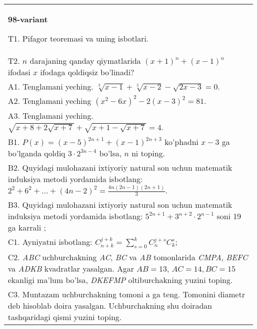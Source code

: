 \documentclass{article}
\begin{document}
\begin{tabular}{m{17cm}}
\textbf{98-variant}
\newline

T1. Pifagor teoremasi va uning isbotlari. \\
T2. \(n\) darajaning qanday qiymatlarida \((x + 1)^{n} + (x - 1)^{n}\) ifodasi \(x\) ifodaga qoldiqsiz bo'linadi? \\
A1. Tenglamani yeching. \(\sqrt[3]{x - 1} + \sqrt[3]{x - 2} - \sqrt{2x - 3} = 0\). \\
A2. Tenglamani yeching \(\left( x^{2} - 6x \right)^{2} - 2(x - 3)^{2} = 81\). \\
A3. Tenglamani yeching. \(\sqrt{x + 8 + 2\sqrt{x + 7}} + \sqrt{x + 1 - \sqrt{x + 7}} = 4\). \\
B1. \(P(x) = (x - 5)^{2n + 1} + (x - 1)^{2n + 3}\) ko'phadni \(x - 3\) ga bo'lganda qoldiq \(3 \cdot 2^{3n - 4}\) bo'lsa, \(n\) ni toping. \\
B2. Quyidagi mulohazani ixtiyoriy natural son uchun matematik induksiya metodi yordamida isbotlang: \(2^{2} + 6^{2} + \ldots + (4n - 2)^{2} = \frac{4n(2n - 1)(2n + 1)}{3}\). \\
B3. Quyidagi mulohazani ixtiyoriy natural son uchun matematik induksiya metodi yordamida isbotlang: \(5^{2n + 1} + 3^{n + 2} \cdot 2^{n - 1}\) soni 19 ga karrali ; \\
C1. Ayniyatni isbotlang: \(C_{n + k}^{j + k} = \sum_{s = 0}^{k}C_{n}^{j + s}C_{k}^{s}\); \\
C2. \emph{ABC} uchburchakning \emph{AC}, \emph{BC} va \emph{AB} tomonlarida \emph{CMPA}, \emph{BEFC} va \emph{ADKB} kvadratlar yasalgan. Agar \(AB = 13\), \(AC = 14,BC = 15\) ekanligi ma'lum bo'lsa, \emph{DKEFMP} oltiburchakning yuzini toping. \\
C3. Muntazam uchburchakning tomoni a ga teng. Tomonini diametr deb hisoblab doira yasalgan. Uchburchakning shu doiradan tashqaridagi qismi yuzini toping. \\

\end{tabular}
\vspace{1cm}
\end{document}

